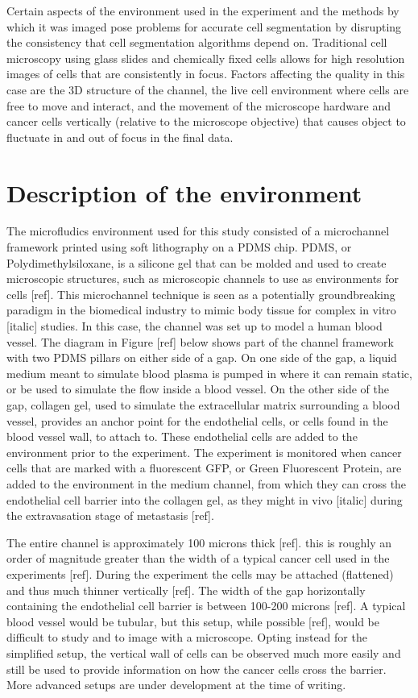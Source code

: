 Certain aspects of the environment used in the experiment and the methods by which it was imaged pose problems for accurate cell segmentation by disrupting the consistency that cell segmentation algorithms depend on. Traditional cell microscopy using glass slides and chemically fixed cells allows for high resolution images of cells that are consistently in focus. Factors affecting the quality in this case are the 3D structure of the channel, the live cell environment where cells are free to move and interact, and the movement of the microscope hardware and cancer cells vertically (relative to the microscope objective) that causes object to fluctuate in and out of focus in the final data.

\section{Description of the environment}

The microfludics environment used for this study consisted of a microchannel framework printed using soft lithography on a PDMS chip. PDMS, or Polydimethylsiloxane, is a silicone gel that can be molded and used to create microscopic structures, such as microscopic channels to use as environments for cells [ref]. This microchannel technique is seen as a potentially groundbreaking paradigm in the biomedical industry to mimic body tissue for complex in vitro [italic] studies. In this case, the channel was set up to model a human blood vessel. The diagram in Figure [ref] below shows part of the channel framework with two PDMS pillars on either side of a gap. On one side of the gap, a liquid medium meant to simulate blood plasma is pumped in where it can remain static, or be used to simulate the flow inside a blood vessel. On the other side of the gap, collagen gel, used to simulate the extracellular matrix surrounding a blood vessel, provides an anchor point for the endothelial cells, or cells found in the blood vessel wall, to attach to. These endothelial cells are added to the environment prior to the experiment. The experiment is monitored when cancer cells that are marked with a fluorescent GFP, or Green Fluorescent Protein, are added to the environment in the medium channel, from which they can cross the endothelial cell barrier into the collagen gel, as they might in vivo [italic] during the extravasation stage of metastasis [ref].

The entire channel is approximately 100 microns thick [ref]. this is roughly an order of magnitude greater than the width of a typical cancer cell used in the experiments [ref]. During the experiment the cells may be attached (flattened) and thus much thinner vertically [ref]. The width of the gap horizontally containing the endothelial cell barrier is between 100-200 microns [ref]. A typical blood vessel would be tubular, but this setup, while possible [ref], would be difficult to study and to image with a microscope. Opting instead for the simplified setup, the vertical wall of cells can be observed much more easily and still be used to provide information on how the cancer cells cross the barrier. More advanced setups are under development at the time of writing.

